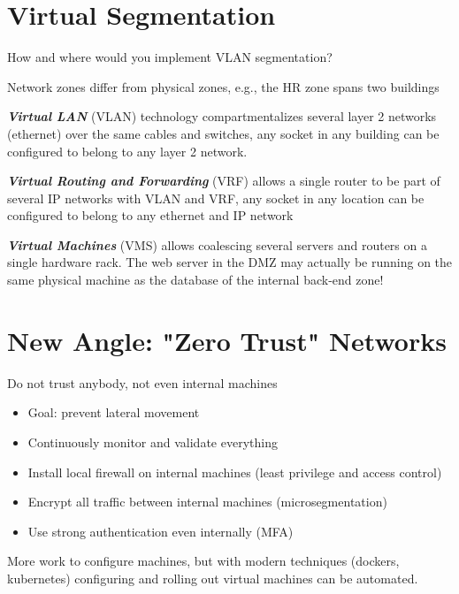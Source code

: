 \documentclass[11pt]{article}
\begin{document}
\section*{Virtual Segmentation}

\begin{tcolorbox}[
  colback=orange!15,     %
  colframe=black!50,    %
  boxrule=1pt,       %
  arc=3mm,             %
  left=4mm, right=4mm, top=2mm, bottom=2mm %
]
How and where would you implement VLAN segmentation?
\end{tcolorbox}

Network zones differ from physical zones, e.g., the HR zone spans two buildings

\textbf{\textit{Virtual LAN}} (VLAN) technology compartmentalizes several layer 2 networks (ethernet) over the same cables and switches, any socket in any building can be configured to belong to any layer 2 network. 

\textbf{\textit{Virtual Routing and Forwarding}} (VRF) allows a single router to be part of several IP networks with VLAN and VRF, any socket in any location can be configured to belong to any ethernet and IP network

\textbf{\textit{Virtual Machines}} (VMS) allows coalescing several servers and routers on a single hardware rack. The web server in the DMZ may actually be running on the same physical machine as the database of the internal back-end zone!

\section*{New Angle: "Zero Trust" Networks}

Do not trust anybody, not even internal machines
\begin{itemize}
	\item Goal: prevent lateral movement
	\item Continuously monitor and validate everything
	\item Install local firewall on internal machines (least privilege and access control)
	\item Encrypt all traffic between internal machines (microsegmentation)
	\item Use strong authentication even internally (MFA)
\end{itemize}

More work to configure machines, but with modern techniques (dockers, kubernetes) configuring and rolling out virtual machines can be automated. 
\end{document}
